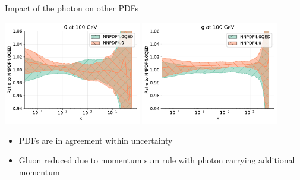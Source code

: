 \documentclass[aspectratio=169, 8pt,t]{beamer}
\begin{document}
\begin{frame}{Impact of the photon on other PDFs}
  \begin{center}
    \includegraphics[width=0.45\textwidth]{figures/nnpdf40_vs_qed_ubar.pdf}
    \includegraphics[width=0.45\textwidth]{figures/nnpdf40_vs_qed_g.pdf}
  \end{center}
  \begin{itemize}
    \item PDFs are in agreement within uncertainty
    \item Gluon reduced due to momentum sum rule with photon carrying additional momentum
  \end{itemize}
\end{frame}
\end{document}
